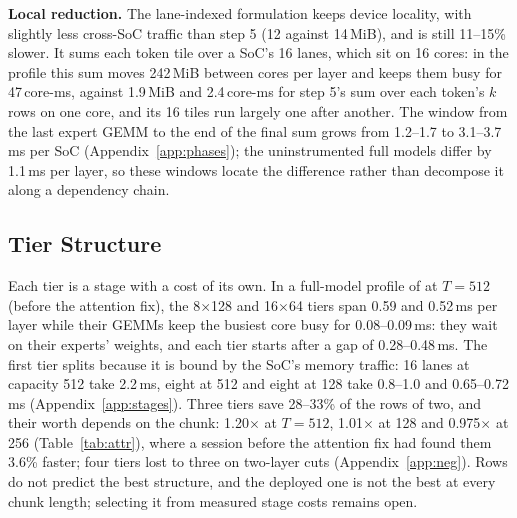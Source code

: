 \textbf{Local reduction.} The lane-indexed formulation keeps device locality, with slightly less cross-SoC traffic than
step 5 (12 against 14\,MiB), and is still 11--15\% slower. It sums each token tile over a SoC's 16 lanes, which sit on 16
cores: in the profile this sum moves 242\,MiB between cores per layer and keeps them busy for 47\,core-ms, against 1.9\,MiB
and 2.4\,core-ms for step 5's sum over each token's $k$ rows on one core, and its 16 tiles run largely one after another.
The window from the last expert GEMM to the end of the final sum grows from 1.2--1.7 to 3.1--3.7\,ms per SoC
(Appendix~\ref{app:phases}); the uninstrumented full models differ by 1.1\,ms per layer, so these windows locate the
difference rather than decompose it along a dependency chain.

\subsection{Tier Structure}
\label{sec:eval-pad}

Each tier is a stage with a cost of its own. In a full-model profile of \sys at $T=512$ (before the attention fix), the
8$\times$128 and 16$\times$64 tiers span 0.59 and 0.52\,ms per layer while their GEMMs keep the busiest core busy for
0.08--0.09\,ms: they wait on their experts' weights, and each tier starts after a gap of 0.28--0.48\,ms. The first tier
splits because it is bound by the SoC's memory traffic: 16 lanes at capacity 512 take 2.2\,ms, eight at 512 and eight at 128
take 0.8--1.0 and 0.65--0.72\,ms (Appendix~\ref{app:stages}). Three tiers save 28--33\% of the rows of two, and their worth
depends on the chunk: 1.20$\times$ at $T=512$, 1.01$\times$ at 128 and 0.975$\times$ at 256 (Table~\ref{tab:attr}), where a
session before the attention fix had found them 3.6\% faster; four tiers lost to three on two-layer cuts
(Appendix~\ref{app:neg}). Rows do not predict the best structure, and the deployed one is not the best at every chunk length;
selecting it from measured stage costs remains open.


